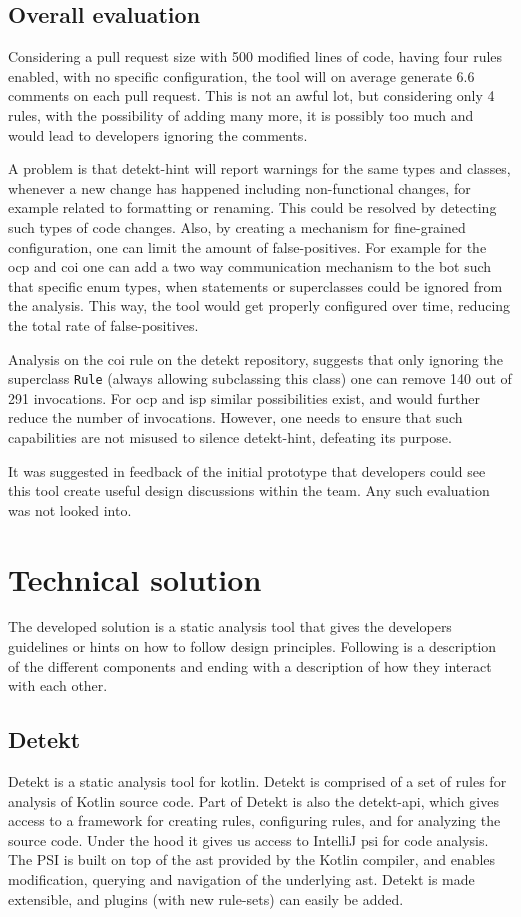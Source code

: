 \documentclass{report}
\begin{document}
\subsection{Overall evaluation}
    Considering a pull request size with 500 modified lines of code, having four rules enabled, with no specific configuration, the tool will on average generate 6.6 comments on each pull request. This is not an awful lot, but considering only 4 rules, with the possibility of adding many more, it is possibly too much and would lead to developers ignoring the comments. 


A problem is that detekt-hint will report warnings for the same types and classes, whenever a new change has happened including non-functional changes, for example related to formatting or renaming. This could be resolved by detecting such types of code changes. Also, by creating a mechanism for fine-grained configuration, one can limit the amount of false-positives. For example for the \gls{ocp} and \gls{coi} one can add a two way communication mechanism to the bot such that specific enum types, when statements or superclasses could be ignored from the analysis. This way, the tool would get properly configured over time, reducing the total rate of false-positives. 

Analysis on the \gls{coi} rule on the detekt repository, suggests that only ignoring the superclass \texttt{Rule} (always allowing subclassing this class) one can remove 140 out of 291 invocations. For \gls{ocp} and \gls{isp} similar possibilities exist, and would further reduce the number of invocations. However, one needs to ensure that such capabilities are not misused to silence detekt-hint, defeating its purpose.

It was suggested in feedback of the initial prototype that developers could see this tool create useful design discussions within the team. Any such evaluation was not looked into. 

\section{Technical solution}
\label{technical-solution}

The developed solution is a static analysis tool that gives the developers guidelines or hints on how to follow design principles. Following is a description of the different components and ending with a description of how they interact with each other.


\subsection{Detekt}
Detekt is a static analysis tool for kotlin. Detekt is comprised of a set of rules for analysis of Kotlin source code. Part of Detekt is also the detekt-api, which gives access to a framework for creating rules, configuring rules, and for analyzing the source code. Under the hood it gives us access to IntelliJ \gls{psi} for code analysis. The PSI is built on top of the \gls{ast} provided by the Kotlin compiler, and enables modification, querying and navigation of the underlying \gls{ast}. Detekt is made extensible, and plugins (with new rule-sets) can easily be added.   
\end{document}
